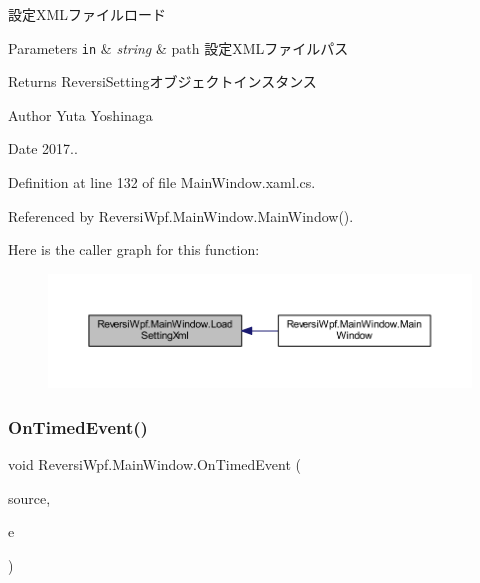 設定\+X\+M\+Lファイルロード 


\begin{DoxyParams}[1]{Parameters}
\mbox{\tt in}  & {\em string} & path 設定\+X\+M\+Lファイルパス \\
\hline
\end{DoxyParams}
\begin{DoxyReturn}{Returns}
Reversi\+Settingオブジェクトインスタンス 
\end{DoxyReturn}
\begin{DoxyAuthor}{Author}
Yuta Yoshinaga 
\end{DoxyAuthor}
\begin{DoxyDate}{Date}
2017.. 
\end{DoxyDate}


Definition at line 132 of file Main\+Window.\+xaml.\+cs.



Referenced by Reversi\+Wpf.\+Main\+Window.\+Main\+Window().

Here is the caller graph for this function\+:\nopagebreak
\begin{figure}[H]
\begin{center}
\leavevmode
\includegraphics[width=350pt]{class_reversi_wpf_1_1_main_window_ad911eb50aa81ec46e9f1032f264ee483_icgraph}
\end{center}
\end{figure}
\mbox{\label{class_reversi_wpf_1_1_main_window_a6cd816c500d85c09bcec5ff7d46c9a04}} 
\subsubsection{\texorpdfstring{On\+Timed\+Event()}{OnTimedEvent()}}
{\footnotesize\ttfamily void Reversi\+Wpf.\+Main\+Window.\+On\+Timed\+Event (\begin{DoxyParamCaption}\item[{object}]{source,  }\item[{Elapsed\+Event\+Args}]{e }\end{DoxyParamCaption})\hspace{0.3cm}{\ttfamily [private]}}



